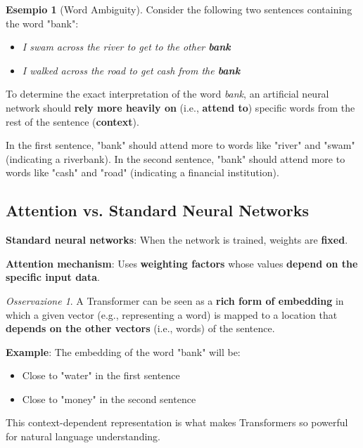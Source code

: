 \documentclass[11pt,a4paper]{article}
\theoremstyle{definition}
\newtheorem{example}{Esempio}[section]
\theoremstyle{plain}
\theoremstyle{remark}
\newtheorem*{observation}{Osservazione}
\begin{document}
\begin{example}[Word Ambiguity]
Consider the following two sentences containing the word "bank":
\begin{itemize}
    \item \textit{I swam across the river to get to the other \textbf{bank}}
    \item \textit{I walked across the road to get cash from the \textbf{bank}}
\end{itemize}

To determine the exact interpretation of the word \textit{bank}, an artificial neural network should \textbf{rely more heavily on} (i.e., \textbf{attend to}) specific words from the rest of the sentence (\textbf{context}).

In the first sentence, "bank" should attend more to words like "river" and "swam" (indicating a riverbank). In the second sentence, "bank" should attend more to words like "cash" and "road" (indicating a financial institution).
\end{example}

\subsection{Attention vs. Standard Neural Networks}

\begin{tcolorbox}[colback=orange!10!white,colframe=orange!75!black,title=\textbf{Key Difference}]
\textbf{Standard neural networks}: When the network is trained, weights are \textbf{fixed}.

\textbf{Attention mechanism}: Uses \textbf{weighting factors} whose values \textbf{depend on the specific input data}.
\end{tcolorbox}

\begin{observation}
A Transformer can be seen as a \textbf{rich form of embedding} in which a given vector (e.g., representing a word) is mapped to a location that \textbf{depends on the other vectors} (i.e., words) of the sentence.

\textbf{Example}: The embedding of the word "bank" will be:
\begin{itemize}
    \item Close to "water" in the first sentence
    \item Close to "money" in the second sentence
\end{itemize}

This context-dependent representation is what makes Transformers so powerful for natural language understanding.
\end{observation}
\end{document}
